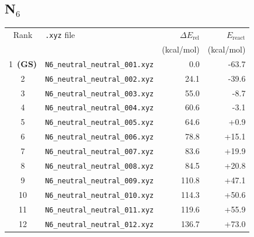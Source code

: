 \documentclass[11pt,a4paper]{article}
\begin{document}
\subsection*{N$_{6}$}
\begin{longtable}{clrr}
\toprule
Rank & \texttt{.xyz} file & $\Delta E_\text{rel}$ & $E_\text{react}$ \\
 & & (kcal/mol) & (kcal/mol) \\
\midrule\endhead
\rowcolor{gs}1~\textbf{(GS)} & \texttt{N6\_neutral\_neutral\_001.xyz} & 0.0 & -63.7 \\
2 & \texttt{N6\_neutral\_neutral\_002.xyz} & 24.1 & -39.6 \\
3 & \texttt{N6\_neutral\_neutral\_003.xyz} & 55.0 & -8.7 \\
4 & \texttt{N6\_neutral\_neutral\_004.xyz} & 60.6 & -3.1 \\
5 & \texttt{N6\_neutral\_neutral\_005.xyz} & 64.6 & +0.9 \\
6 & \texttt{N6\_neutral\_neutral\_006.xyz} & 78.8 & +15.1 \\
7 & \texttt{N6\_neutral\_neutral\_007.xyz} & 83.6 & +19.9 \\
8 & \texttt{N6\_neutral\_neutral\_008.xyz} & 84.5 & +20.8 \\
9 & \texttt{N6\_neutral\_neutral\_009.xyz} & 110.8 & +47.1 \\
10 & \texttt{N6\_neutral\_neutral\_010.xyz} & 114.3 & +50.6 \\
11 & \texttt{N6\_neutral\_neutral\_011.xyz} & 119.6 & +55.9 \\
12 & \texttt{N6\_neutral\_neutral\_012.xyz} & 136.7 & +73.0 \\
\bottomrule
\end{longtable}
\end{document}

